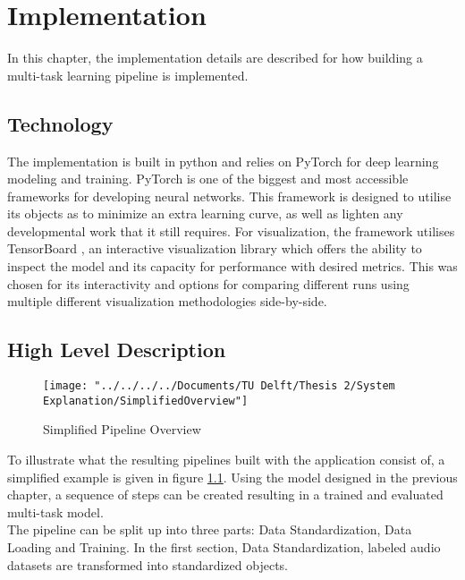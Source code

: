 \chapter{Implementation} \label{Impl}

In this chapter, the implementation details are described for how building a multi-task learning pipeline is implemented. 

\section{Technology} \label{Impl:Technology}

The implementation is built in python and relies on PyTorch \citep{paszke2019pytorch} for deep learning modeling and training. PyTorch is one of the biggest and most accessible frameworks for developing neural networks. This framework is designed to utilise its objects as to minimize an extra learning curve, as well as lighten any developmental work that it still requires. For visualization, the framework utilises TensorBoard \cite{girija2016tensorflow}, an interactive visualization library which offers the ability to inspect the model and its capacity for performance with desired metrics. This was chosen for its interactivity and options for comparing different runs using multiple different visualization methodologies side-by-side.


\section{High Level Description} \label{Impl:Description}

\begin{figure}
	\centering
	\texttt{[image: "../../../../Documents/TU Delft/Thesis 2/System Explanation/SimplifiedOverview"]}
	\caption{Simplified Pipeline Overview}
	\label{fig:simplifiedoverview}
\end{figure}

To illustrate what the resulting pipelines built with the application consist of, a simplified example is given in figure \ref{fig:simplifiedoverview}. Using the model designed in the previous chapter, a sequence of steps can be created resulting in a trained and evaluated multi-task model. \\

The pipeline can be split up into three parts: Data Standardization, Data Loading and Training. In the first section, Data Standardization, labeled audio datasets are transformed into standardized objects. 

